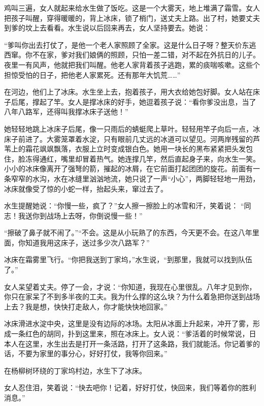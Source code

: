 \documentclass{ctexart}
\renewcommand{\\}{\par}
\begin{document}
\\鸡叫三遍，女人就起来给水生做了饭吃。这是一个大雾天，地上堆满了霜雪。女人把孩子叫醒，穿得暖暖的，背上冰床，锁了梢门，送丈夫上路。出了村，她要丈夫到爹的坟上去看看。水生说以后回来再去，女人坚持要去。她说：\\“爹叫你出去打仗了，是他一个老人家照顾了全家。这是什么日子呀？整天价东逃西窜。你不在家，爹对我们娘俩的照顾，只怕一差二错，对不起在外抗日的儿子。夜里一有风声，他就把我们叫醒。他老人家背着孩子逃跑，累的痰喘咳嗽。这些个担惊受怕的日子，把他老人家累死。还有那年大饥荒……”
\\在河边，他们上了冰床。水生坐上去，抱着孩子，用大衣给她包好脚。女人站在床子后尾，撑起了竿。女人是撑冰床的好手，她逗着孩子说：“看你爹没出息，当了八年八路军，还得叫我撑冰床子送他！”\\她轻轻地跳上冰床子后尾，像一只雨后的蜻蜓爬上草叶。轻轻用竿子向后一点，冰床子前进了。大雾笼罩着水淀，只有眼前几丈远的冰道可以望见。河两岸残留的芦苇上的霜花飒飒飘落，衣服上立时变成银白色。她用一块长的黑布紧紧把头发包住，脸冻得通红，嘴里却冒着热气。她连撑几竿，然后直起身子来，向水生一笑。小小的冰床像离开了强弩的箭，摧起的冰屑，在它前面打起团团的旋花。前面有一条窄窄的水沟，水在冰缝里汹汹地流，她只说了一声“小心”，两脚轻轻地一用劲，冰床就像受了惊的小蛇一样，抬起头来，窜过去了。\\水生提醒她说：“你慢一些，疯了？”女人擦一擦脸上的冰雪和汗，笑着说： “同志！我送你到战场上去呀，你倒说慢一些！”\\“擦破了鼻子就不闹了。”“不会。这是从小玩熟了的东西，今天更不会。在这八年里面，你知道我用这床子，送过多少次八路军？”\\冰床在霜雾里飞行。“你把我送到丁家坞，”水生说，“到那里，我就可以找到队伍了。”\\女人呆望着丈夫。停了一会，才说：“你知道，我现在心里很乱。八年才见到你，你只在家呆了不到多半夜的工夫。我为什么撑的这么块？为什么着急把你送到战场上去？我是想，快快打走敌人，你才能快快地回家。”\\冰床滑进水淀中央，这里是没有边际的冰场。太阳从冰面上升起来，冲开了雾，形成一条红色的胡同，扑到这里来，照在冰床上。女人说：“爹活着的时候常说，日本人在这里，水生出去是打开一条活路，打开了这条路，我们就能活。你记着爹的话，不要为家里的事分心，好好打仗，我等你回来。”\\在杨柳树环绕的丁家坞村边，水生下了冰床。\\女人忍住泪，笑着说：“快去吧你！记着，好好打仗，快回来，我们等着你的胜利消息。”\\ 
\songti
\end{document}
